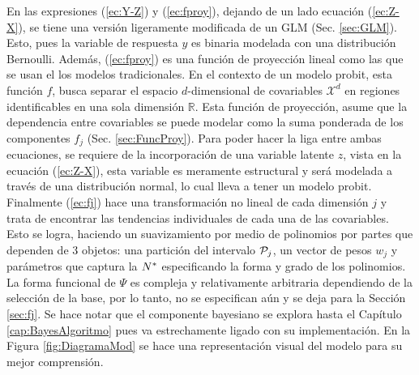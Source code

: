 \documentclass[../Main/Main.tex]{subfiles}
\begin{document}
En las expresiones (\ref{ec:Y-Z}) y (\ref{ec:fproy}), dejando de un lado ecuación (\ref{ec:Z-X}), se tiene una versión ligeramente modificada de un GLM (Sec. \ref{sec:GLM}). Esto, pues la variable de respuesta $y$ es binaria modelada con una distribución Bernoulli. Además, (\ref{ec:fproy}) es una función de proyección lineal como las que se usan el los modelos tradicionales. En el contexto de un modelo probit, esta función $f$, busca separar el espacio $d$-dimensional de covariables $\mathcal{X}^d$ en regiones identificables en una sola dimensión $\mathbb{R}$. Esta función de proyección, asume que la dependencia entre covariables se puede modelar como la suma ponderada de los componentes $f_j$ (Sec. \ref{sec:FuncProy}). Para poder hacer la liga entre ambas ecuaciones, se requiere de la incorporación de una variable latente $z$, vista en la ecuación (\ref{ec:Z-X}), esta variable es meramente estructural y será modelada a través de una distribución normal, lo cual lleva a tener un modelo probit. Finalmente (\ref{ec:fj}) hace una transformación no lineal de cada dimensión $j$ y trata de encontrar las tendencias individuales de cada una de las covariables. Esto se logra, haciendo un suavizamiento por medio de polinomios por partes que dependen de 3 objetos: una partición del intervalo $\P_j$, un vector de pesos $w_j$ y parámetros que captura la $\N$ especificando la forma y grado de los polinomios. La forma funcional de $\Psi$ es compleja y relativamente arbitraria dependiendo de la selección de la base, por lo tanto, no se especifican aún y se deja para la Sección \ref{sec:fj}. Se hace notar que el componente bayesiano se explora hasta el Capítulo \ref{cap:BayesAlgoritmo} pues va estrechamente ligado con su implementación.  En la Figura \ref{fig:DiagramaMod} se hace una representación visual del modelo para su mejor comprensión.
\end{document}
